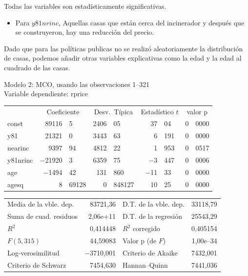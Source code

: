 Todas las variables son estadísticamente significativas. 

\begin{itemize}
    \item Para $y81nrinc$, Aquellas casas que están cerca del incinerador y después que se construyeron, hay una reducción del precio.
\end{itemize}

Dado que para las políticas publicas no se realizó aleatoriamente la distribución de casas, podemos añadir otras variables explicativas como la edad y la edad al cuadrado de las casas.


\begin{center}

Modelo 2: MCO, usando las observaciones 1--321\\
Variable dependiente: rprice\\

\vspace{1em}

\begin{tabular}{lr@{,}lr@{,}lr@{,}lr@{,}l}
  &
 \multicolumn{2}{c}{Coeficiente} &
  \multicolumn{2}{c}{Desv.\ Típica} &
   \multicolumn{2}{c}{Estadístico $t$} &
    \multicolumn{2}{c}{valor p} \\[1ex]
const &
  89116&5 &
    2406&05 &
      37&04 &
        0&0000 \\
y81 &
  21321&0 &
    3443&63 &
      6&191 &
        0&0000 \\
nearinc &
  9397&94 &
    4812&22 &
      1&953 &
        0&0517 \\
y81nrinc &
  $-$21920&3 &
    6359&75 &
      $-$3&447 &
        0&0006 \\
age &
  $-$1494&42 &
    131&860 &
      $-$11&33 &
        0&0000 \\
agesq &
  8&69128 &
    0&848127 &
      10&25 &
        0&0000 \\
\end{tabular}

\vspace{1ex}
\begin{tabular}{lrlr}
Media de la vble. dep. &  83721,36 & D.T. de la vble. dep. &  33118,79 \\
Suma de cuad. residuos &  2,06\textrm{e+11} & D.T. de la regresión &  25543,29 \\
$R^2$ &  0,414448 & $R^2$ corregido &  0,405154 \\
$F(5, 315)$ &  44,59083 & Valor p (de $F$) &  1,00\textrm{e--34} \\
Log-verosimilitud & $-$3710,001 & Criterio de Akaike &  7432,001 \\
Criterio de Schwarz &  7454,630 & Hannan--Quinn &  7441,036 \\
\end{tabular}


\end{center}


